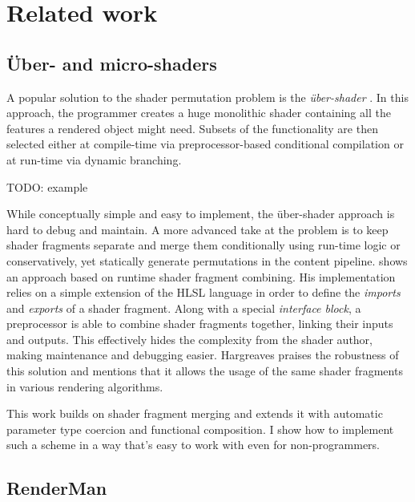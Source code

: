 
\chapter{ Related work }
\label{Chapter3}

\section{Über- and micro-shaders}

A popular solution to the shader permutation problem is the \emph{ über-shader }. In this approach, the programmer creates a huge monolithic shader containing all the features a rendered object might need. Subsets of the functionality are then selected either at compile-time via preprocessor-based conditional compilation or at run-time via dynamic branching.

TODO: example

While conceptually simple and easy to implement, the über-shader approach is hard to debug and maintain. A more advanced take at the problem is to keep shader fragments separate and merge them conditionally using run-time logic or conservatively, yet statically generate permutations in the content pipeline. \citet{Hargreaves04} shows an approach based on runtime shader fragment combining. His implementation relies on a simple extension of the HLSL language in order to define the \emph{imports} and \emph{exports} of a shader fragment. Along with a special \emph{interface block}, a preprocessor is able to combine shader fragments together, linking their inputs and outputs. This effectively hides the complexity from the shader author, making maintenance and debugging easier. Hargreaves praises the robustness of this solution and mentions that it allows the usage of the same shader fragments in various rendering algorithms.

This work builds on shader fragment merging and extends it with automatic parameter type coercion and functional composition. I show how to implement such a scheme in a way that's easy to work with even for non-programmers.


\section{RenderMan}

